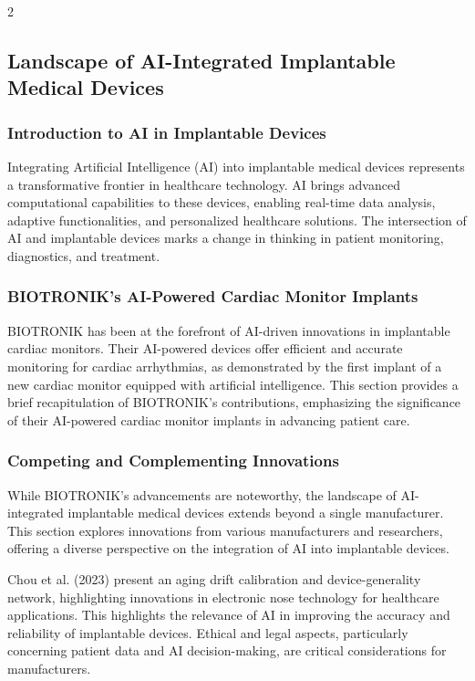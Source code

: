 \documentclass[12pt,oneside]{academia}
\theoremstyle{remark}
\begin{document}
\begin{multicols}{2}
\subsection{Landscape of AI-Integrated Implantable Medical Devices}

\subsubsection{Introduction to AI in Implantable Devices}
Integrating Artificial Intelligence (AI) into implantable medical devices represents a transformative frontier in healthcare technology. AI brings advanced computational capabilities to these devices, enabling real-time data analysis, adaptive functionalities, and personalized healthcare solutions. The intersection of AI and implantable devices marks a change in thinking in patient monitoring, diagnostics, and treatment.

\subsubsection{BIOTRONIK's AI-Powered Cardiac Monitor Implants}
BIOTRONIK has been at the forefront of AI-driven innovations in implantable cardiac monitors. Their AI-powered devices offer efficient and accurate monitoring for cardiac arrhythmias, as demonstrated by the first implant of a new cardiac monitor equipped with artificial intelligence. This section provides a brief recapitulation of BIOTRONIK's contributions, emphasizing the significance of their AI-powered cardiac monitor implants in advancing patient care.

\subsubsection{Competing and Complementing Innovations}
While BIOTRONIK's advancements are noteworthy, the landscape of AI-integrated implantable medical devices extends beyond a single manufacturer. This section explores innovations from various manufacturers and researchers, offering a diverse perspective on the integration of AI into implantable devices.

Chou et al. (2023) present an aging drift calibration and device-generality network, highlighting innovations in electronic nose technology for healthcare applications. This highlights the relevance of AI in improving the accuracy and reliability of implantable devices. Ethical and legal aspects, particularly concerning patient data and AI decision-making, are critical considerations for manufacturers.


\end{multicols}
\end{document}
